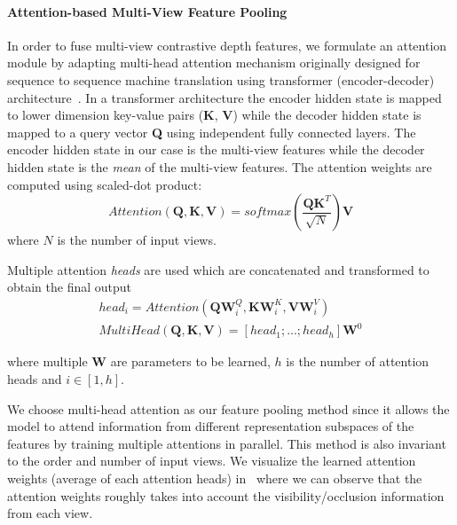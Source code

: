 \paragraph{Attention-based Multi-View Feature Pooling}
In order to fuse multi-view contrastive depth features, we formulate an attention module by adapting multi-head attention mechanism originally designed for sequence to sequence machine translation using transformer (encoder-decoder) architecture~\cite{vaswani2017attention}.
In a transformer architecture the encoder hidden state is mapped to lower dimension key-value pairs (\textbf{K}, \textbf{V})
while the decoder hidden state is mapped to a query vector \textbf{Q} using independent fully connected layers.
The encoder hidden state in our case is the multi-view features while the decoder hidden state is the \emph{mean} of the multi-view features.
The attention weights are computed using scaled-dot product:
\begin{equation}
    Attention(\mathbf{Q}, \mathbf{K}, \mathbf{V}) = softmax(\frac{\mathbf{Q} \mathbf{K}^{T}}{\sqrt{N}}) \mathbf{V}
    \label{equ:attention}
\end{equation}
\noindent where $N$ is the number of input views.

Multiple attention \emph{heads} are used which are concatenated and transformed to obtain the final output
\begin{align}
    head_i = Attention(\mathbf{Q} \mathbf{W}^{Q}_{i}, \mathbf{K} \mathbf{W}^{K}_{i}, \mathbf{V} \mathbf{W}^{V}_{i}) \label{equ:attention_head} \\
    MultiHead(\mathbf{Q}, \mathbf{K}, \mathbf{V}) = [head_1; ...; head_h] \mathbf{W}^0 \label{equ:multihead_attention}
\end{align}

\noindent where multiple $\mathbf{W}$ are parameters to be learned,
$h$ is the number of attention heads and $i\in[1,h]$.


We choose multi-head attention as our feature pooling method since it allows the model to attend information from different representation subspaces of the features by training multiple attentions in parallel.
This method is also invariant to the order and number of input views.
We visualize the learned attention weights (average of each attention heads) in~ where we can observe that the attention weights roughly takes into account the visibility/occlusion information from each view.


